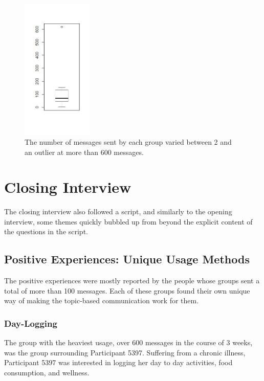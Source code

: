     \begin{figure}
      \centering
      \includegraphics[width=0.3\textwidth]{messages_per_group.jpeg}
      \caption[Messages Sent by Groups]{
        The number of messages sent by each group varied between
        2 and an outlier at more than 600 messages.
      }
      \label{fig:topic_hours}
      \end{figure}

\section{Closing Interview}
  The closing interview also followed a script,
  and similarly to the opening interview, some themes quickly bubbled up from
  beyond the explicit content of the questions in the script.

  \subsection{Positive Experiences: Unique Usage Methods}
    The positive experiences were mostly reported by the people
    whose groups sent a total of more than 100 messages.
    Each of these groups found their own unique way of making the topic-based
    communication work for them.

    \subsubsection{Day-Logging}
    The group with the heaviest usage, over 600 messages in the course of 3 weeks,
    was the group surrounding Participant 5397.
    Suffering from a chronic illness,
    Participant 5397 was interested in logging her day to day activities,
    food consumption, and wellness.

